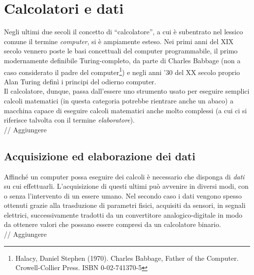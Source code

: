 
\chapter{Calcolatori e dati} %

\label{Chapter2} %


Negli ultimi due secoli il concetto di ``calcolatore'', a cui è subentrato nel
lessico comune il termine \emph{computer}, si è ampiamente esteso. Nei primi
anni del XIX secolo vennero poste le basi concettuali del computer programmabile, 
il primo modernamente definibile Turing-completo, da parte di Charles Babbage 
(non a caso considerato il padre del computer\footnote{Halacy, Daniel Stephen (1970). 
Charles Babbage, Father of the Computer. Crowell-Collier Press. ISBN 0-02-741370-5})
e negli anni '30 del XX secolo proprio Alan Turing definì i principi del odierno computer. 
\\
Il calcolatore, dunque, passa dall'essere uno strumento usato per
eseguire semplici calcoli matematici (in questa categoria potrebbe rientrare
anche un abaco) a macchina capace di eseguire calcoli matematici anche molto 
complessi (a cui ci si riferisce talvolta con il termine \emph{elaboratore}).
\\
// Aggiungere


\section{Acquisizione ed elaborazione dei dati}

Affinché un computer possa eseguire dei calcoli è necessario che disponga di
\emph{dati} su cui effettuarli. L'acquisizione di questi ultimi può avvenire
in diversi modi, con o senza l'intervento di un essere umano.
Nel secondo caso i dati vengono spesso ottenuti grazie alla trasduzione 
di parametri fisici, acquisiti da sensori, in segnali elettrici, successivamente
tradotti da un convertitore analogico-digitale in modo da ottenere valori che 
possano essere compresi da un calcolatore binario.
\\
// Aggiungere

